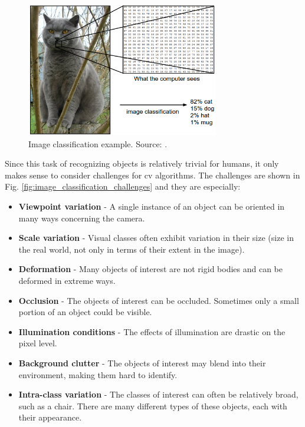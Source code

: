         \begin{figure}[ht]
            \centering
            \includegraphics[width=0.75\textwidth]{resources/image_classification.png}
            \caption{Image classification example. Source: \cite{cs231n}.}
            \label{fig:image_classification}
        \end{figure}
    
        Since this task of recognizing objects is relatively trivial for humans, it only makes sense to consider challenges for \gls{cv} algorithms. The challenges are shown in Fig. \ref{fig:image_classification_challenges} and they are especially:
    
        \begin{itemize}
            \item \textbf{Viewpoint variation} - A single instance of an object can be oriented in many ways concerning the camera.
            \item \textbf{Scale variation} - Visual classes often exhibit variation in their size (size in the real world, not only in terms of their extent in the image).
            \item \textbf{Deformation} - Many objects of interest are not rigid bodies and can be deformed in extreme ways.
            \item \textbf{Occlusion} - The objects of interest can be occluded. Sometimes only a small portion of an object could be visible.
            \item \textbf{Illumination conditions} - The effects of illumination are drastic on the pixel level.
            \item \textbf{Background clutter} - The objects of interest may blend into their environment, making them hard to identify.
            \item \textbf{Intra-class variation} - The classes of interest can often be relatively broad, such as a chair. There are many different types of these objects, each with their appearance.
        \end{itemize}
        
